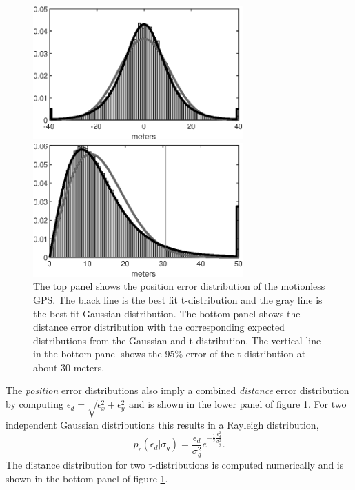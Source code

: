 \documentclass[10pt,journal]{IEEEtran}
\begin{document}
\begin{figure}
  \centerline{\includegraphics[width=19pc,angle=0]{figures/gps_error_distribution}}
  \centerline{\includegraphics[width=19pc,angle=0]{figures/gps_distance_error_distribution}} 
  \caption{The top panel shows the position error distribution of the motionless GPS. The black line is the best fit t-distribution and the gray line is the best fit Gaussian distribution. The bottom panel shows the distance error distribution with the corresponding expected distributions from the Gaussian and t-distribution. The vertical line in the bottom panel shows the 95\% error of the t-distribution at about 30 meters.}
  \label{motionless_error}
\end{figure}

The \emph{position} error distributions also imply a combined \emph{distance} error distribution by computing $\epsilon_d = \sqrt{\epsilon_x^2 + \epsilon_y^2}$ and is shown in the lower panel of figure \ref{motionless_error}. For two independent Gaussian distributions this results in a Rayleigh distribution,
\begin{equation}
\label{rayleigh_pdf}
p_r(\epsilon_d|\sigma_g) = \frac{\epsilon_d}{\sigma_g^2 } e^{-\frac{1}{2}\frac{\epsilon_d^2}{\sigma_g^2}}.
\end{equation}
The distance distribution for two t-distributions is computed numerically and is shown in the bottom panel of figure \ref{motionless_error}.
\end{document}

